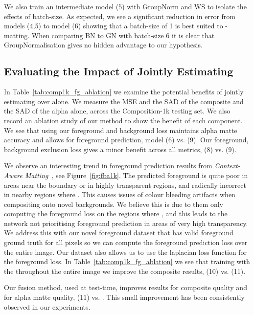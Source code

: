 \documentclass[runningheads]{llncs}
\begin{document}
We also train an intermediate model (5) with GroupNorm and WS to isolate the effects of batch-size. As expected, we see a significant reduction in error from models (4,5) to model (6) showing that a batch-size of 1 is best suited to -matting. When comparing BN to GN with batch-size 6 it is clear that GroupNormalisation gives no hidden advantage to our hypothesis. 


\subsection{Evaluating the Impact of Jointly Estimating }

In Table~\ref{tab:comp1k_fg_ablation} we examine the potential benefits of jointly estimating  over  alone. We measure the MSE and the SAD of the  composite and the SAD of the alpha alone, across the Composition-1k testing set. We also record an ablation study of our method to show the benefit of each component. We see that using our foreground and background loss  maintains alpha matte accuracy and allows for foreground prediction, model (6) vs. (9). Our foreground, background exclusion loss gives a minor benefit across all metrics, (8) vs. (9).

We observe an interesting trend in foreground prediction results from \textit{Context-Aware Matting}~\cite{ContextMatting}, see Figure~\ref{fig:fba1k}. The predicted foreground is quite poor in areas near the boundary or in highly transparent regions, and radically incorrect in nearby regions where . This causes issues of colour bleeding artifacts when compositing onto novel backgrounds. We believe this is due to them only computing the foreground loss on the regions where , and this leads to the network not prioritising foreground prediction in areas of very high transparency. We address this with our novel foreground dataset that has valid foreground ground truth for all pixels so we can compute the foreground prediction loss over the entire image. Our dataset also allows us to use the laplacian loss function for the foreground loss. In Table~\ref{tab:comp1k_fg_ablation} we see that training with the  throughout the entire image we improve the composite  results, (10) vs. (11). 


Our  fusion method, used at test-time, improves results for composite quality and for alpha matte quality, (11) vs. {}. This small improvement has been consistently observed in our experiments.
\end{document}
